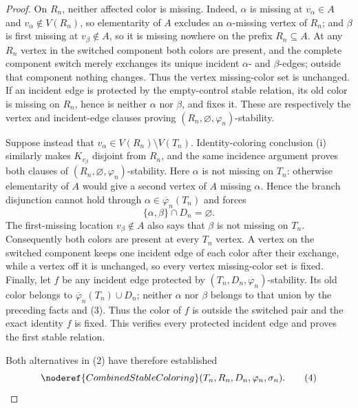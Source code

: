 \begin{proof}
On $R_n$, neither affected color is missing.  Indeed, $\alpha$ is missing
at $v_\alpha\in A$ and $v_\alpha\notin V(R_n)$, so elementarity of $A$
excludes an $\alpha$-missing vertex of $R_n$; and $\beta$ is first missing
at $v_\beta\notin A$, so it is missing nowhere on the prefix $R_n\subseteq
A$.  At any $R_n$ vertex in the switched component both colors are present,
and the complete component switch merely exchanges its unique incident
$\alpha$- and $\beta$-edges; outside that component nothing changes.  Thus
the vertex missing-color set is unchanged.  If an incident edge is
protected by the empty-control stable relation, its old color is missing on
$R_n$, hence is neither $\alpha$ nor $\beta$, and
 fixes it.  These are respectively the
vertex and incident-edge clauses proving
$(R_n,\varnothing,\varphi_n)$-stability.

Suppose instead that $v_\alpha\in V(R_n)\setminus V(T_n)$.  Identity-coloring
conclusion (i) similarly makes $K_{v_\beta}$ disjoint from $R_n$, and the
same incidence argument proves both clauses of
$(R_n,\varnothing,\varphi_n)$-stability.  Here $\alpha$ is not missing on
$T_n$: otherwise elementarity of $A$ would give a second vertex of $A$
missing $\alpha$.  Hence the branch disjunction cannot hold through
$\alpha\in\overline\varphi_n(T_n)$ and forces
\[
                     \{\alpha,\beta\}\cap D_n=\varnothing.    \tag{3}
\]
The first-missing location $v_\beta\notin A$ also says that $\beta$ is not
missing on $T_n$.  Consequently both colors are present at every $T_n$
vertex.  A vertex on the switched component keeps one incident edge of each
color after their exchange, while a vertex off it is unchanged, so every
vertex missing-color set is fixed.  Finally, let $f$ be any incident edge
protected by $(T_n,D_n,\varphi_n)$-stability.  Its old color belongs to
$\overline\varphi_n(T_n)\cup D_n$; neither $\alpha$ nor $\beta$ belongs to
that union by the preceding facts and (3).  Thus the color of $f$ is outside
the switched pair and the exact identity $f$ is fixed.  This verifies every
protected incident edge and proves the first stable relation.

Both alternatives in (2) have therefore established
\[
 \noderef{CombinedStableColoring}(T_n,R_n,D_n,\varphi_n,\sigma_n).
                                                                  \tag{4}
\]


\end{proof}
